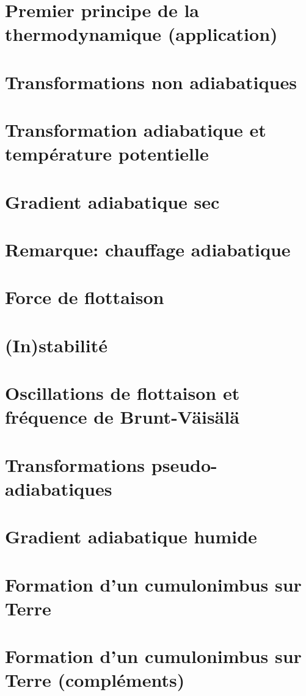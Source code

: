 \documentclass[a4paper,DIV16,10pt]{scrartcl}
\begin{document}
\newpage
\section{Premier principe de la thermodynamique (application)}

\section{Transformations non adiabatiques}


\newpage
\section{Transformation adiabatique et température potentielle}

\section{Gradient adiabatique sec}

\section{Remarque: chauffage adiabatique}


\newpage
\section{Force de flottaison}


\newpage
\section{(In)stabilité}


\newpage
\section{Oscillations de flottaison et fréquence de Brunt-V{\"a}is{\"a}l{\"a}}


\newpage
\section{Transformations pseudo-adiabatiques}


\newpage
\section{Gradient adiabatique humide}


\newpage
\section{Formation d'un cumulonimbus sur Terre}


\newpage
\section{Formation d'un cumulonimbus sur Terre (compléments)}

\end{document}
